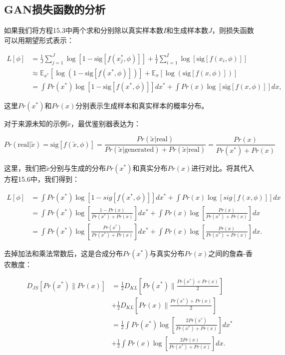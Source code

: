 \subsection{GAN损失函数的分析}
如果我们将方程15.3中两个求和分别除以真实样本数\(I\)和生成样本数\(J\)，则损失函数可以用期望形式表示：


\begin{align}
L[\phi] &= \frac{1}{J} \sum_{j=1}^{J} \log \left[ 1 - \text{sig}[f(x_j^*, \phi)] \right] + \frac{1}{I} \sum_{i=1}^{I} \log \left[ \text{sig}[f(x_i, \phi)] \right] \\
&\approx \mathbb{E}_{x^*} \left[ \log \left( 1 - \text{sig}[f(x^*, \phi)] \right) \right] + \mathbb{E}_{x} \left[ \log \left( \text{sig}[f(x, \phi)] \right) \right] \\
&= \int Pr(x^*) \log \left[ 1 - \text{sig}[f(x^*, \phi)] \right] dx^* + \int Pr(x) \log \left[ \text{sig}[f(x, \phi)] \right] dx, 
\end{align} 


这里\(Pr(x^*)\)和\(Pr(x)\)分别表示生成样本和真实样本的概率分布。

对于来源未知的示例\(\tilde{x}\)，最优鉴别器表达为：

\begin{equation}
Pr(\text{real}|\tilde{x}) = \text{sig}[f(\tilde{x}, \phi)] = \frac{Pr(\tilde{x}|\text{real})}{Pr(\tilde{x}|\text{generated}) + Pr(\tilde{x}|\text{real})} = \frac{Pr(x)}{Pr(x^*) + Pr(x)} 
\end{equation}

这里，我们把\(\tilde{x}\)分别与生成的分布\(Pr(x^*)\)和真实分布\(Pr(x)\)进行对比。将其代入方程15.6中，我们得到：


\begin{align}
L[\phi] &= \int Pr(x^*) \log [1 - sig[f(x^*, \phi)]] dx^* + \int Pr(x) \log [sig[f(x, \phi)]] dx \\
&= \int Pr(x^*) \log \left[ \frac{1 - Pr(x)}{Pr(x^*) + Pr(x)} \right] dx^* + \int Pr(x) \log \left[ \frac{Pr(x)}{Pr(x^*) + Pr(x)} \right] dx \\
&= \int Pr(x^*) \log \left[ \frac{Pr(x^*)}{Pr(x^*) + Pr(x)} \right] dx^* + \int Pr(x) \log \left[ \frac{Pr(x)}{Pr(x^*) + Pr(x)} \right] dx. 
\end{align} 



去掉加法和乘法常数后，这是合成分布\(Pr(x^*)\)与真实分布\(Pr(x)\)之间的詹森-香农散度：


\begin{align}
D_{JS} [ Pr(x^*) \| Pr(x) ] &= \frac{1}{2} D_{KL} \left[ Pr(x^*) \| \frac{Pr(x^*) + Pr(x)}{2} \right] \\
&+ \frac{1}{2} D_{KL} \left[ Pr(x) \| \frac{Pr(x^*) + Pr(x)}{2} \right] \\
&= \frac{1}{2} \int Pr(x^*) \log \left[ \frac{2Pr(x^*)}{Pr(x^*) + Pr(x)} \right] dx^* \\
&+ \frac{1}{2} \int Pr(x) \log \left[ \frac{2Pr(x)}{Pr(x^*) + Pr(x)} \right] dx. 
\end{align} 


